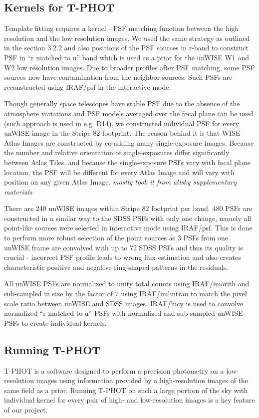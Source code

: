 \documentclass[apj,iop]{emulateapj}
\begin{document}
\subsection{Kernels for T-PHOT}

Template fitting requires a kernel - PSF matching function between the high resolution and the low resolution images. We used the same strategy as outlined in the section 3.2.2 and also positions of the PSF sources in r-band to construct PSF in ``r matched to u'' band which is used as a prior for the unWISE W1 and W2 low resolution images. Due to broader profiles after PSF matching, some PSF sources now have contamination from the neighbor sources. Such PSFs are reconstructed using IRAF/psf in the interactive mode.

Though generally space telescopes have stable PSF due to the absence of the atmosphere variations and PSF models averaged over the focal plane can be used (such approach is used in e.g. D14), we constructed individual PSF for every unWISE image in the Stripe 82 footprint. The reason behind it is that WISE Atlas Images are constructed by co-adding many single-exposure images. Because the number and relative orientation of single-exposures differ significantly between Atlas Tiles, and because the single-exposure PSFs vary with focal plane location, the PSF will be different for every Atlas Image and will vary with position on any given Atlas Image. \textit{mostly took it from allsky supplementary materials}

There are 240 unWISE images within Stripe 82 footprint per band. 480 PSFs are constructed in a similar way to the SDSS PSFs with only one change, namely all point-like sources were selected in interactive mode using IRAF/psf. This is done to perform more robust selection of the point sources as 3 PSFs from one unWISE frame are convolved with up to 72 SDSS PSFs and thus its quality is crucial - incorrect PSF profile leads to wrong flux estimation and also creates characteristic positive and negative ring-shaped patterns in the residuals.

All unWISE PSFs are normalized to unity total counts using IRAF/imarith and sub-sampled in size by the factor of 7 using IRAF/imlintran to match the pixel scale ratio between unWISE and SDSS images. IRAF/lucy is used to convolve normalized ``r matched to u'' PSFs with normalized and sub-sampled unWISE PSFs to create individual kernels.

\subsection{Running T-PHOT}
T-PHOT is a software designed to perform a precision photometry on a low-resolution images using information provided by a high-resolution images of the same field as a prior. Running T-PHOT on such a large portion of the sky with individual kernel for every pair of high- and low-resolution images is a key feature of our project.
\end{document}
